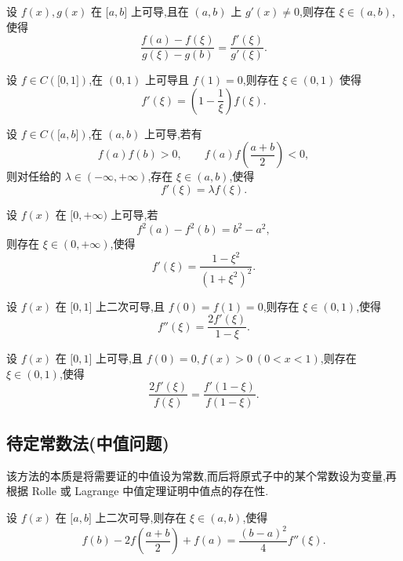 \documentclass[../数学分析培优讲义.tex]{subfiles}
\begin{document}
\begin{example}
设 $f(x),g(x)$ 在 $\lbrack a,b\rbrack$ 上可导,且在 $(a,b)$ 上 $g'(x)\neq0$,则存在 $\xi\in(a,b)$,使得
\[
    \dfrac{f(a)-f(\xi)}{g(\xi)-g(b)}=\dfrac{f'(\xi)}{g'(\xi)}.
\]
\end{example}
\exampleblank

\begin{example}
设 $f\in C(\lbrack 0,1\rbrack)$,在 $(0,1)$ 上可导且 $f(1)=0$,则存在 $\xi\in(0,1)$ 使得
\[
    f'(\xi)=\left(1-\dfrac{1}{\xi}\right)f(\xi).
\]
\end{example}
\exampleblank

\begin{example}
设 $f\in C(\lbrack a,b\rbrack)$,在 $(a,b)$ 上可导,若有
\[
    f(a)f(b)>0,
    \qquad
    f(a)f\left(\dfrac{a+b}{2}\right)<0,
\]
则对任给的 $\lambda\in(-\infty,+\infty)$,存在 $\xi\in(a,b)$,使得
\[
    f'(\xi)=\lambda f(\xi).
\]
\end{example}
\exampleblank

\begin{example}
设 $f(x)$ 在 $\lbrack 0,+\infty)$ 上可导,若
\[
    f^2(a)-f^2(b)=b^2-a^2,
\]
则存在 $\xi\in(0,+\infty)$,使得
\[
    f'(\xi)=\dfrac{1-\xi^2}{(1+\xi^2)^2}.
\]
\end{example}
\exampleblank

\begin{example}
设 $f(x)$ 在 $\lbrack 0,1\rbrack$ 上二次可导,且 $f(0)=f(1)=0$,则存在 $\xi\in(0,1)$,使得
\[
    f''(\xi)=\dfrac{2f'(\xi)}{1-\xi}.
\]
\end{example}
\exampleblank

\begin{example}
设 $f(x)$ 在 $\lbrack 0,1\rbrack$ 上可导,且 $f(0)=0,f(x)>0\ (0<x<1)$,则存在 $\xi\in(0,1)$,使得
\[
    \dfrac{2f'(\xi)}{f(\xi)}
    =\dfrac{f'(1-\xi)}{f(1-\xi)}.
\]
\end{example}
\exampleblank


\newpage

\subsection{待定常数法(中值问题)}

该方法的本质是将需要证的中值设为常数,而后将原式子中的某个常数设为变量,再根据 Rolle 或 Lagrange 中值定理证明中值点的存在性.

\begin{example}
设 $f(x)$ 在 $\lbrack a,b\rbrack$ 上二次可导,则存在 $\xi\in(a,b)$,使得
\[
    f(b)-2f\left(\dfrac{a+b}{2}\right)+f(a)
    =\dfrac{(b-a)^2}{4}f''(\xi).
\]
\end{example}
\exampleblank
\end{document}
